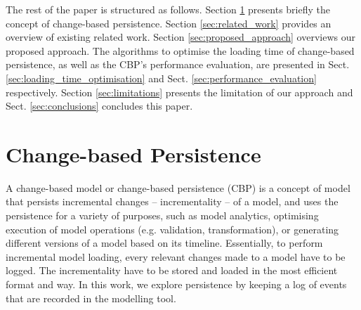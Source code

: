\documentclass{llncs}
\begin{document}
The rest of the paper is structured as follows. Section \ref{sec:change_based_persistence} presents briefly the concept of change-based persistence. Section \ref{sec:related_work} provides an overview of existing related work. Section \ref{sec:proposed_approach} overviews our proposed approach. The algorithms to optimise the loading time of change-based persistence, as well as the CBP's performance evaluation, are presented in Sect. \ref{sec:loading_time_optimisation} and Sect. \ref{sec:performance_evaluation} respectively. 
Section \ref{sec:limitations} presents the limitation of our approach and Sect. \ref{sec:conclusions} concludes this paper.

\section{Change-based Persistence}
\label{sec:change_based_persistence}
A change-based model or change-based persistence (CBP) is a concept of model that persists incremental changes -- incrementality -- of a model, and uses the persistence for a variety of purposes, such as model analytics, optimising execution of model operations (e.g. validation, transformation), or generating different versions of a model based on its timeline. Essentially, to perform incremental model loading, every relevant changes made to a model have to be logged. The incrementality have to be stored and loaded in the most efficient format and way. In this work, we explore persistence by keeping a log of events that are recorded in the modelling tool.
\end{document}
